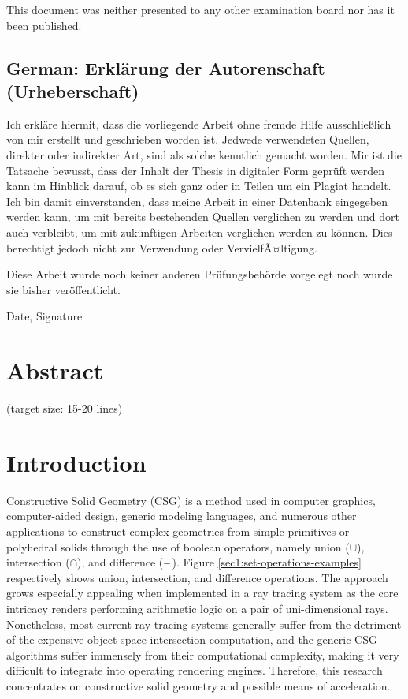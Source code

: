 \documentclass[a4paper,11pt,oneside]{article}
\newcommand{\minus}{\scalebox{0.9}[1.0]{$-$}} %
\begin{document}
This document was neither presented to any other examination board
nor has it been published.

\subsection*{German: Erklärung der Autorenschaft (Urheberschaft)}
 
Ich erkläre hiermit, dass die vorliegende Arbeit ohne fremde Hilfe
ausschließlich von mir erstellt und geschrieben worden ist. Jedwede
verwendeten Quellen, direkter oder indirekter Art, sind als solche
kenntlich gemacht worden. Mir ist die Tatsache bewusst, dass der
Inhalt der Thesis in digitaler Form geprüft werden kann im Hinblick
darauf, ob es sich ganz oder in Teilen um ein Plagiat handelt. Ich
bin damit einverstanden, dass meine Arbeit in einer Datenbank
eingegeben werden kann, um mit bereits bestehenden Quellen
verglichen zu werden und dort auch verbleibt, um mit zukünftigen
Arbeiten verglichen werden zu können. Dies berechtigt jedoch nicht
zur Verwendung oder VervielfÃ¤ltigung.

Diese Arbeit wurde noch keiner anderen Prüfungsbehörde vorgelegt
noch wurde sie bisher veröffentlicht.

\vspace{20mm}

Date, Signature

\newpage

\section*{Abstract}
  
   
  
(target size: 15-20 lines)

\newpage
\tableofcontents

\clearpage
{}

\section{Introduction}
  
Constructive Solid Geometry (CSG) is a method used in computer graphics, computer-aided design, generic modeling languages, and numerous other applications to construct complex geometries from simple primitives or polyhedral solids through the use of boolean operators, namely union ($\cup$),  intersection ($\cap$), and difference ($\minus$). Figure \ref{sec1:set-operations-examples} respectively shows union, intersection, and difference operations. The approach grows especially appealing when implemented in a ray tracing system as the core intricacy renders performing arithmetic logic on a pair of uni-dimensional rays. Nonetheless, most current ray tracing systems generally suffer from the detriment of the expensive object space intersection computation, and the generic CSG algorithms suffer immensely from their computational complexity, making it very difficult to integrate into operating rendering engines. Therefore, this research concentrates on constructive solid geometry and possible means of acceleration.
  
\end{document}
